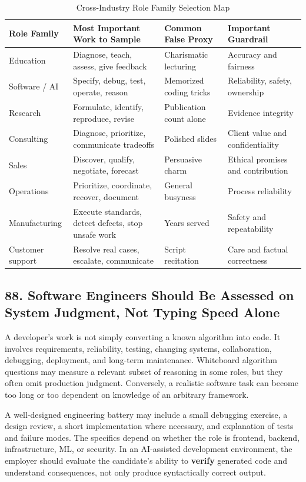 \begin{table}[t]
\centering
\small
\caption{Cross-Industry Role Family Selection Map}
\label{tab:cross_industry_selection}
\begin{tabularx}{\textwidth}{p{2.8cm} p{4.5cm} p{4.0cm} X}
\toprule
\textbf{Role Family} & \textbf{Most Important Work to Sample} & \textbf{Common False Proxy} & \textbf{Important Guardrail} \\
\midrule
Education & Diagnose, teach, assess, give feedback & Charismatic lecturing & Accuracy and fairness \\
Software / AI & Specify, debug, test, operate, reason & Memorized coding tricks & Reliability, safety, ownership \\
Research & Formulate, identify, reproduce, revise & Publication count alone & Evidence integrity \\
Consulting & Diagnose, prioritize, communicate tradeoffs & Polished slides & Client value and confidentiality \\
Sales & Discover, qualify, negotiate, forecast & Persuasive charm & Ethical promises and contribution \\
Operations & Prioritize, coordinate, recover, document & General busyness & Process reliability \\
Manufacturing & Execute standards, detect defects, stop unsafe work & Years served & Safety and repeatability \\
Customer support & Resolve real cases, escalate, communicate & Script recitation & Care and factual correctness \\
\bottomrule
\end{tabularx}
\end{table}

\subsection*{88. Software Engineers Should Be Assessed on System Judgment, Not Typing Speed Alone}

A developer's work is not simply converting a known algorithm into code. It involves requirements, reliability, testing, changing systems, collaboration, debugging, deployment, and long-term maintenance. Whiteboard algorithm questions may measure a relevant subset of reasoning in some roles, but they often omit production judgment. Conversely, a realistic software task can become too long or too dependent on knowledge of an arbitrary framework.

A well-designed engineering battery may include a small debugging exercise, a design review, a short implementation where necessary, and explanation of tests and failure modes. The specifics depend on whether the role is frontend, backend, infrastructure, ML, or security. In an AI-assisted development environment, the employer should evaluate the candidate's ability to \textbf{verify} generated code and understand consequences, not only produce syntactically correct output.

